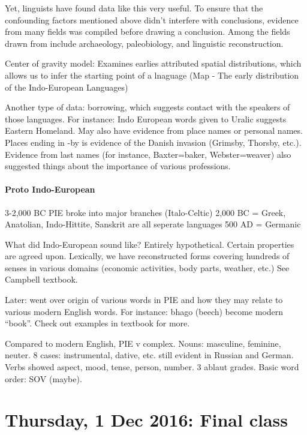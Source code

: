 \documentclass{exam}
\begin{document}
Yet, linguists have found data like this very useful.
To ensure that the confounding factors mentioned above didn't interfere with conclusions, evidence from many fields was compiled before drawing a conclusion.
Among the fields drawn from include archaeology, paleobiology, and linguistic reconstruction. 

Center of gravity model: Examines earlies attributed spatial distributions, which allows us to infer the starting point of a lnaguage
(Map - The early distribution of the Indo-European Languages)

Another type of data: borrowing, which suggests contact with the speakers of those languages. 
For instance: Indo European words given to Uralic suggests Eastern Homeland. 
May also have evidence from place names or personal names. 
Places ending in -by is evidence of the Danish invasion (Grimsby, Thorsby, etc.). 
Evidence from last names (for instance, Baxter=baker, Webster=weaver) also suggested things about the importance of various professions. 

\paragraph{Proto Indo-European}
3-2,000 BC PIE broke into major branches (Italo-Celtic)
2,000 BC = Greek, Anatolian, Indo-Hittite, Sanskrit are all seperate languages
500 AD = Germanic

What did Indo-European sound like? Entirely hypothetical.
Certain properties are agreed upon.
Lexically, we have reconstructed forms covering hundreds of senses in various domains (economic activities, body parts, weather, etc.) 
See Campbell textbook. 


Later: went over origin of various words in PIE and how they may relate to various modern English words. 
For instance: bhago (beech) become modern ``book''. 
Check out examples in textbook for more. 

Compared to modern English, PIE v complex.
Nouns: masculine, feminine, neuter.
8 cases: instrumental, dative, etc. still evident in Russian and German. 
Verbs showed aspect, mood, tense, person, number. 
3 ablaut grades. 
Basic word order: SOV (maybe). 


\section{Thursday, 1 Dec 2016: Final class}
\end{document}
